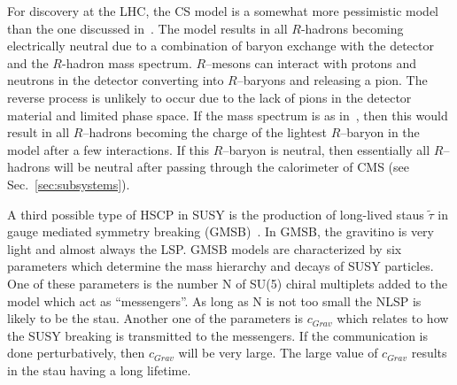For discovery at the LHC, the CS model is a somewhat more pessimistic model than the one discussed in~\cite{Mackeprang:2009ad}.
The model results in all $R$-hadrons becoming electrically neutral due to a combination of baryon exchange with the detector and the $R$-hadron mass spectrum.
$R$--mesons can interact with protons and neutrons in the detector converting into $R$--baryons and releasing a pion.
The reverse process is unlikely to occur due to the lack of pions in the detector material and limited phase space.
If the mass spectrum is as in~\cite{Mackeprang:2009ad}, then this would result in all $R$--hadrons becoming the charge of the lightest $R$--baryon in the model
after a few interactions. If this $R$--baryon is neutral, then essentially all $R$--hadrons will be neutral after passing through the calorimeter of CMS
(see Sec.~\ref{sec:subsystems}).

A third possible type of HSCP in SUSY is the production of long-lived staus $\tilde{\tau}$ in gauge mediated symmetry breaking (GMSB)~\cite{Giudice:1998bp}. 
In GMSB, the gravitino is very light and almost always the LSP.
GMSB models are characterized by six parameters which determine the mass hierarchy and decays of SUSY particles.
One of these parameters is the number N of SU(5) chiral multiplets added to the model which act as ``messengers''.
As long as N is not too small the NLSP is likely to be the stau.
Another one of the parameters is $c_{Grav}$ which relates to how the SUSY breaking is transmitted to the messengers.
If the communication is done perturbatively, then $c_{Grav}$ will be very large.
The large value of $c_{Grav}$ results in the stau having a long lifetime.

